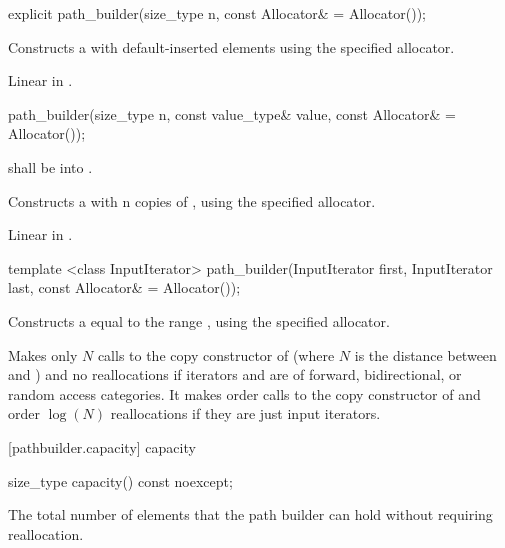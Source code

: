 \begin{itemdecl}
explicit path_builder(size_type n, const Allocator& = Allocator());
\end{itemdecl}
\begin{itemdescr}
\pnum
\effects
Constructs a  with  default-inserted elements using the specified allocator.

\pnum
\complexity
Linear in .
\end{itemdescr}

\begin{itemdecl}
path_builder(size_type n, const value_type& value,
  const Allocator& = Allocator());
\end{itemdecl}
\begin{itemdescr}
\pnum
\requires
{} shall be  into .

\pnum
\effects
Constructs a  with n copies of , using the specified allocator.

\pnum
\complexity
Linear in .
\end{itemdescr}

\begin{itemdecl}
template <class InputIterator>
path_builder(InputIterator first, InputIterator last,
  const Allocator& = Allocator());
\end{itemdecl}
\begin{itemdescr}
\pnum
\effects
Constructs a  equal to the range , using the specified allocator.

\pnum
\complexity
Makes only $N$ calls to the copy constructor of  (where $N$
is the distance between
and
)
and no reallocations if iterators  and  are of forward, bidirectional, or random access categories.
It makes order
calls to the copy constructor of
and order
$\log(N)$
reallocations if they are just input iterators.

\end{itemdescr}

 [pathbuilder.capacity] { capacity}

\begin{itemdecl}
size_type capacity() const noexcept;
\end{itemdecl}
\begin{itemdescr}
\pnum
\returns
The total number of elements that the path builder can hold without requiring reallocation.
\end{itemdescr}

